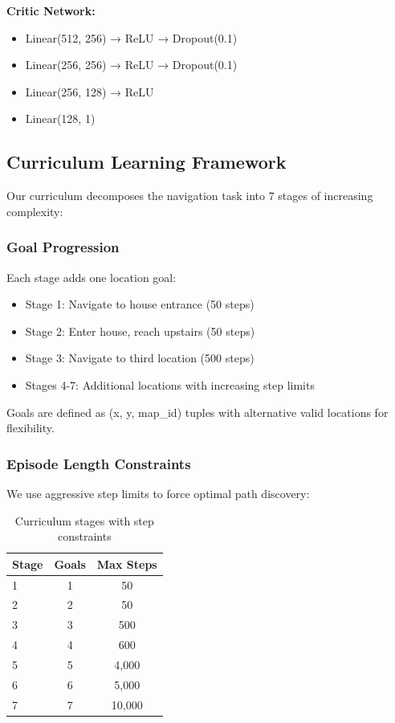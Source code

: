 \documentclass[12pt,a4paper]{article}
\begin{document}
\textbf{Critic Network:}
\begin{itemize}
    \item Linear(512, 256) → ReLU → Dropout(0.1)
    \item Linear(256, 256) → ReLU → Dropout(0.1)
    \item Linear(256, 128) → ReLU
    \item Linear(128, 1)
\end{itemize}

\subsection{Curriculum Learning Framework}

Our curriculum decomposes the navigation task into 7 stages of increasing complexity:

\subsubsection{Goal Progression}

Each stage adds one location goal:
\begin{itemize}
    \item Stage 1: Navigate to house entrance (50 steps)
    \item Stage 2: Enter house, reach upstairs (50 steps)
    \item Stage 3: Navigate to third location (500 steps)
    \item Stages 4-7: Additional locations with increasing step limits
\end{itemize}

Goals are defined as (x, y, map\_id) tuples with alternative valid locations for flexibility.

\subsubsection{Episode Length Constraints}

We use aggressive step limits to force optimal path discovery:

\begin{table}[h]
\centering
\begin{tabular}{lcc}
\toprule
Stage & Goals & Max Steps \\
\midrule
1 & 1 & 50 \\
2 & 2 & 50 \\
3 & 3 & 500 \\
4 & 4 & 600 \\
5 & 5 & 4,000 \\
6 & 6 & 5,000 \\
7 & 7 & 10,000 \\
\bottomrule
\end{tabular}
\caption{Curriculum stages with step constraints}
\label{tab:curriculum}
\end{table}
\end{document}

